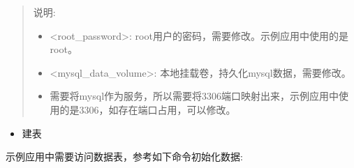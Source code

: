 \documentclass[letterpaper,10pt,english]{sphinxmanual}
\begin{document}
\begin{sphinxVerbatim}[commandchars=\\\{\}]
               
\end{sphinxVerbatim}
\begin{quote}

说明:
\begin{itemize}
\item {} 
\textless{}root\_password\textgreater{}: root用户的密码，需要修改。示例应用中使用的是root。

\item {} 
\textless{}mysql\_data\_volume\textgreater{}: 本地挂载卷，持久化mysql数据，需要修改。

\item {} 
需要将mysql作为服务，所以需要将3306端口映射出来，示例应用中使用的是3306，如存在端口占用，可以修改。

\end{itemize}
\end{quote}
\begin{itemize}
\item {} 
建表

\end{itemize}

示例应用中需要访问数据表，参考如下命令初始化数据:
\end{document}

